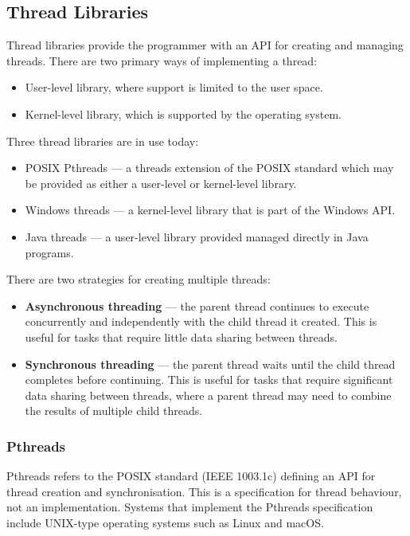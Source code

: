 \documentclass{article}
\begin{document}
\subsection{Thread Libraries}
Thread libraries provide the programmer with an API for creating and
managing threads. There are two primary ways of implementing a thread:
\begin{itemize}
    \item User-level library, where support is limited to the user
          space.
    \item Kernel-level library, which is supported by the operating
          system.
\end{itemize}
Three thread libraries are in use today:
\begin{itemize}
    \item POSIX Pthreads --- a threads extension of the POSIX standard
          which may be provided as either a user-level or kernel-level
          library.
    \item Windows threads --- a kernel-level library that is part of
          the Windows API.
    \item Java threads --- a user-level library provided managed
          directly in Java programs.
\end{itemize}
There are two strategies for creating multiple threads:
\begin{itemize}
    \item \textbf{Asynchronous threading} --- the parent thread
          continues to execute concurrently and independently with the
          child thread it created. This is useful for tasks that
          require little data sharing between threads.
    \item \textbf{Synchronous threading} --- the parent thread waits
          until the child thread completes before continuing. This is
          useful for tasks that require significant data sharing
          between threads, where a parent thread may need to combine the
          results of multiple child threads.
\end{itemize}
\subsubsection{Pthreads}
Pthreads refers to the POSIX standard (IEEE 1003.1c) defining an API
for thread creation and synchronisation. This is a specification for
thread behaviour, not an implementation. Systems that implement the
Pthreads specification include UNIX-type operating systems such as
Linux and macOS.
\end{document}
